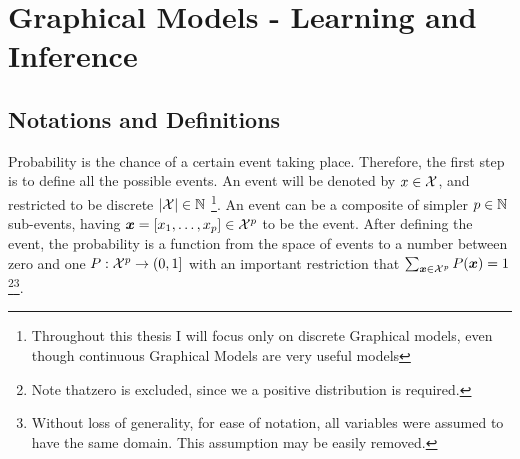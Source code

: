 \section{Graphical Models - Learning and Inference}
\subsection{Notations and Definitions}
\label{sec:def}
Probability is the chance of a certain event taking place.
Therefore, the first step is to define all the possible events.
An event will be denoted by $x \in {\cal X}$, and restricted to be discrete $ |{\cal X}| \in \mathbb{N}$
\footnote{Throughout this thesis I will focus only on discrete Graphical models, even though continuous Graphical Models are very useful models}.
An event can be a composite of simpler $p \in \mathbb{N}$ sub-events, having $\boldsymbol{x} = [x_1, \ldots, x_{p}] \in {\cal X}^p$ to be the event.
After defining the event, the probability is a function from the space of events to a number between zero and one $P:{\cal X}^{p} \to (0,1]$ with an important restriction that $\sum_{\boldsymbol{x} \in {\cal X}^{p}} P(\boldsymbol{x}) = 1$\footnote{Note thatzero is excluded, since we a positive distribution is required.}\footnote{Without loss of generality, for ease of notation, all variables were assumed to have the same domain. This assumption may be easily removed.}.

